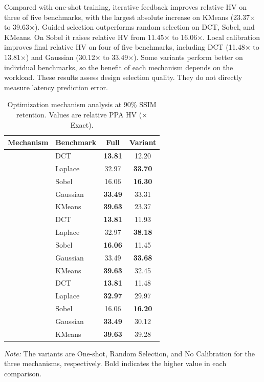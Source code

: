 Compared with one-shot training, iterative feedback improves relative HV on three of five benchmarks, with the largest absolute increase on KMeans (23.37$\times$ to 39.63$\times$). Guided selection outperforms random selection on DCT, Sobel, and KMeans. On Sobel it raises relative HV from 11.45$\times$ to 16.06$\times$. Local calibration improves final relative HV on four of five benchmarks, including DCT (11.48$\times$ to 13.81$\times$) and Gaussian (30.12$\times$ to 33.49$\times$). Some variants perform better on individual benchmarks, so the benefit of each mechanism depends on the workload. These results assess design selection quality. They do not directly measure latency prediction error.

\begin{table}[t]
\centering
\caption{Optimization mechanism analysis at 90\% SSIM retention. Values are relative PPA HV ($\times$ Exact).}
\label{tab:optimization_analysis}
\footnotesize
\renewcommand{\arraystretch}{1.12}
\begin{tabular*}{\columnwidth}{@{\extracolsep{\fill}}llcc@{}}
\toprule
\textbf{Mechanism} & \textbf{Benchmark} &
\textbf{Full} & \textbf{Variant} \\
\midrule
{}
& DCT      & \textbf{13.81} & 12.20 \\
& Laplace  & 32.97 & \textbf{33.70} \\
& Sobel    & 16.06 & \textbf{16.30} \\
& Gaussian & \textbf{33.49} & 33.31 \\
& KMeans   & \textbf{39.63} & 23.37 \\
\midrule
{}
& DCT      & \textbf{13.81} & 11.93 \\
& Laplace  & 32.97 & \textbf{38.18} \\
& Sobel    & \textbf{16.06} & 11.45 \\
& Gaussian & 33.49 & \textbf{33.68} \\
& KMeans   & \textbf{39.63} & 32.45 \\
\midrule
{}
& DCT      & \textbf{13.81} & 11.48 \\
& Laplace  & \textbf{32.97} & 29.97 \\
& Sobel    & 16.06 & \textbf{16.20} \\
& Gaussian & \textbf{33.49} & 30.12 \\
& KMeans   & \textbf{39.63} & 39.28 \\
\bottomrule
\end{tabular*}

\vspace{2pt}
\parbox{\columnwidth}{\footnotesize
\textit{Note:} The variants are One-shot, Random Selection,
and No Calibration for the three mechanisms, respectively.
Bold indicates the higher value in each comparison.
}
\end{table}





